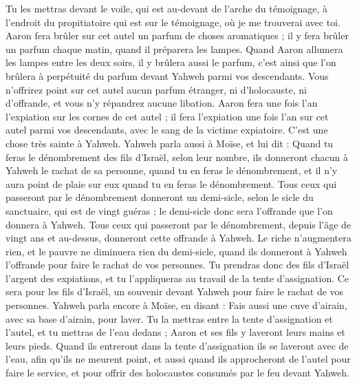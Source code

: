 \begin{multicols}{2}
Tu les mettras devant le voile, qui est au-devant de l'arche du témoignage, à l'endroit du propitiatoire qui est sur le témoignage, où je me trouverai avec toi.
Aaron fera brûler sur cet autel un parfum de choses aromatiques ; il y fera brûler un parfum chaque matin, quand il préparera les lampes.
Quand Aaron allumera les lampes entre les deux soirs, il y brûlera aussi le parfum, c’est ainsi que l’on brûlera à perpétuité du parfum devant Yahweh parmi vos descendants.
Vous n'offrirez point sur cet autel aucun parfum étranger, ni d'holocauste, ni d'offrande, et vous n'y répandrez aucune libation.
Aaron fera une fois l'an l’expiation sur les cornes de cet autel ; il fera l’expiation une fois l'an sur cet autel parmi vos descendants, avec le sang de la victime expiatoire. C'est une chose très sainte à Yahweh.
Yahweh parla aussi à Moïse, et lui dit :
Quand tu feras le dénombrement des fils d'Israël, selon leur nombre, ils donneront chacun à Yahweh le rachat de sa personne, quand tu en feras le dénombrement, et il n'y aura point de plaie sur eux quand tu en feras le dénombrement.
Tous ceux qui passeront par le dénombrement donneront un demi-sicle, selon le sicle du sanctuaire, qui est de vingt guéras ; le demi-sicle donc sera l'offrande que l'on donnera à Yahweh.
Tous ceux qui passeront par le dénombrement, depuis l'âge de vingt ans et au-dessus, donneront cette offrande à Yahweh.
Le riche n'augmentera rien, et le pauvre ne diminuera rien du demi-sicle, quand ils donneront à Yahweh l'offrande pour faire le rachat de vos personnes.
Tu prendras donc des fils d'Israël l'argent des expiations, et tu l'appliqueras au travail de la tente d'assignation. Ce sera pour les fils d'Israël, un souvenir devant Yahweh pour faire le rachat de vos personnes.
Yahweh parla encore à Moïse, en disant :
Fais aussi une cuve d'airain, avec sa base d'airain, pour laver. Tu la mettras entre la tente d'assignation et l'autel, et tu mettras de l'eau dedans ;
Aaron et ses fils y laveront leurs mains et leurs pieds.
Quand ils entreront dans la tente d'assignation ils se laveront avec de l'eau, afin qu'ils ne meurent point, et aussi quand ils approcheront de l'autel pour faire le service, et pour offrir des holocaustes consumés par le feu devant Yahweh.

\end{multicols}
